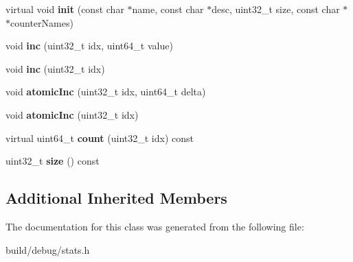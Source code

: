 \begin{DoxyCompactItemize}
\item 
\hypertarget{classVectorCounter_a24f4ecb5f982c44f9a3142b486afda46}{virtual void {\bfseries init} (const char $\ast$name, const char $\ast$desc, uint32\-\_\-t size, const char $\ast$$\ast$counter\-Names)}\label{classVectorCounter_a24f4ecb5f982c44f9a3142b486afda46}

\item 
\hypertarget{classVectorCounter_a803d078febd0aa1122b527f2ba418800}{void {\bfseries inc} (uint32\-\_\-t idx, uint64\-\_\-t value)}\label{classVectorCounter_a803d078febd0aa1122b527f2ba418800}

\item 
\hypertarget{classVectorCounter_a89da3b5154d4449bf7e591b420e6a437}{void {\bfseries inc} (uint32\-\_\-t idx)}\label{classVectorCounter_a89da3b5154d4449bf7e591b420e6a437}

\item 
\hypertarget{classVectorCounter_a4ec59076709f0e4f92da09684b430da6}{void {\bfseries atomic\-Inc} (uint32\-\_\-t idx, uint64\-\_\-t delta)}\label{classVectorCounter_a4ec59076709f0e4f92da09684b430da6}

\item 
\hypertarget{classVectorCounter_a5295f20e13bf83736c805cb0c0124cbf}{void {\bfseries atomic\-Inc} (uint32\-\_\-t idx)}\label{classVectorCounter_a5295f20e13bf83736c805cb0c0124cbf}

\item 
\hypertarget{classVectorCounter_a949669fe418060a4ac3a56dd78800b29}{virtual uint64\-\_\-t {\bfseries count} (uint32\-\_\-t idx) const }\label{classVectorCounter_a949669fe418060a4ac3a56dd78800b29}

\item 
\hypertarget{classVectorCounter_a95f7a0570dc7a6eafeb85cece275d069}{uint32\-\_\-t {\bfseries size} () const }\label{classVectorCounter_a95f7a0570dc7a6eafeb85cece275d069}

\end{DoxyCompactItemize}
\subsection*{Additional Inherited Members}


The documentation for this class was generated from the following file\-:\begin{DoxyCompactItemize}
\item 
build/debug/stats.\-h\end{DoxyCompactItemize}
